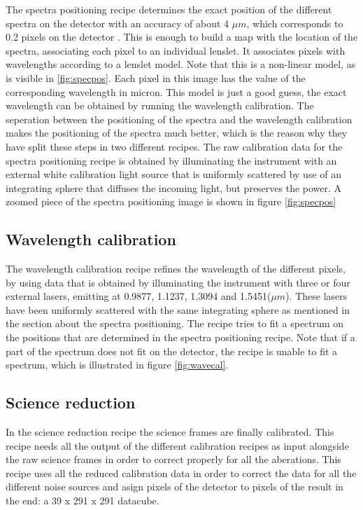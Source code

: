 \documentclass[twoside,single]{lion-msc}
\begin{document}
The spectra positioning recipe determines the exact position of the different spectra on the detector with an accuracy of about 4 $\mu m$, which corresponds to 0.2 pixels on the detector \citep{Desidera}. This is enough to build a map with the location of the spectra, associating each pixel to an individual lenslet. It associates pixels with wavelengths according to a lenslet model. Note that this is a non-linear model, as is visible in \ref{fig:specpos}. Each pixel in this image has the value of the corresponding wavelength in micron. This model is just a good guess, the exact wavelength can be obtained by running the wavelength calibration. The seperation between the positioning of the spectra and the wavelength calibration makes the positioning of the spectra much better, which is the reason why they have split these steps in two different recipes. The raw calibration data for the spectra positioning recipe is obtained by illuminating the instrument with an external white calibration light source that is uniformly scattered by use of an integrating sphere that diffuses the incoming light, but preserves the power. A zoomed piece of the spectra positioning image is shown in figure \ref{fig:specpos}

\subsection{Wavelength calibration}
The wavelength calibration recipe refines the wavelength of the different pixels, by using data that is obtained by illuminating the instrument with three or four external lasers, emitting at 0.9877, 1.1237, 1.3094 and 1.5451($\mu m$). These lasers have been uniformly scattered with the same integrating sphere as mentioned in the section about the spectra positioning. The recipe tries to fit a spectrum on the positions that are determined in the spectra positioning recipe. Note that if a part of the spectrum does not fit on the detector, the recipe is unable to fit a spectrum, which is illustrated in figure \ref{fig:wavecal}.

\subsection{Science reduction}
In the science reduction recipe the science frames are finally calibrated. This recipe needs all the output of the different calibration recipes as input alongside the raw science frames in order to correct properly for all the aberations. This recipe uses all the reduced calibration data in order to correct the data for all the different noise sources and asign pixels of the detector to pixels of the result in the end: a 39 x 291 x 291 datacube.
\end{document}

